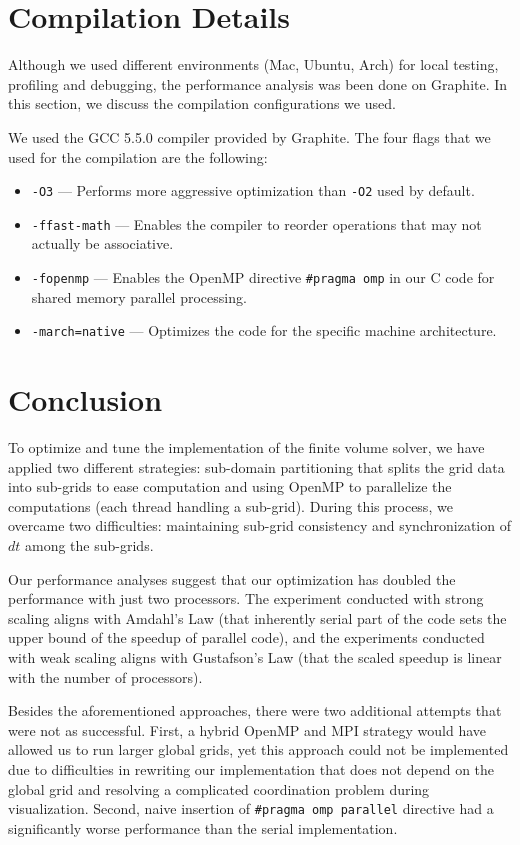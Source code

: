 \documentclass{article}
\begin{document}
\section{Compilation Details}

Although we used different environments (Mac, Ubuntu, Arch) for local testing, profiling and debugging, 
the performance analysis was been done on Graphite. In this section, we discuss the compilation configurations we used.

We used the GCC 5.5.0 compiler provided by Graphite. The four flags that we used for the compilation are the following:
\begin{itemize}
	\item \texttt{-O3} --- Performs more aggressive optimization than \texttt{-O2} used by default.
	\item \texttt{-ffast-math} --- Enables the compiler to reorder operations that may not actually be associative.
	\item \texttt{-fopenmp} --- Enables the OpenMP directive \texttt{\#pragma omp} in our C code for shared memory parallel processing.
	\item \texttt{-march=native} --- Optimizes the code for the specific machine architecture.
\end{itemize}

\section{Conclusion}
To optimize and tune the implementation of the finite volume solver, we have applied two different strategies: 
sub-domain partitioning that splits the grid data into sub-grids to ease computation and using OpenMP to parallelize 
the computations (each thread handling a sub-grid).
During this process, we overcame two difficulties: maintaining sub-grid consistency and synchronization of $dt$ among the sub-grids.

Our performance analyses suggest that our optimization has doubled the performance with just two processors. 
The experiment conducted with strong scaling aligns with Amdahl's Law (that inherently serial part of the code sets the upper bound of the speedup of parallel code), 
and the experiments conducted with weak scaling aligns with Gustafson's Law (that the scaled speedup is linear with the number of processors).

Besides the aforementioned approaches, there were two additional attempts that were not as successful. 
First, a hybrid OpenMP and MPI strategy would have allowed us to run larger global grids, 
yet this approach could not be implemented due to difficulties in rewriting our implementation that does not depend on the global grid and resolving a complicated coordination problem during visualization. 
Second, naive insertion of \texttt{\#pragma omp parallel} directive had a significantly worse performance than the serial implementation.
\end{document}
